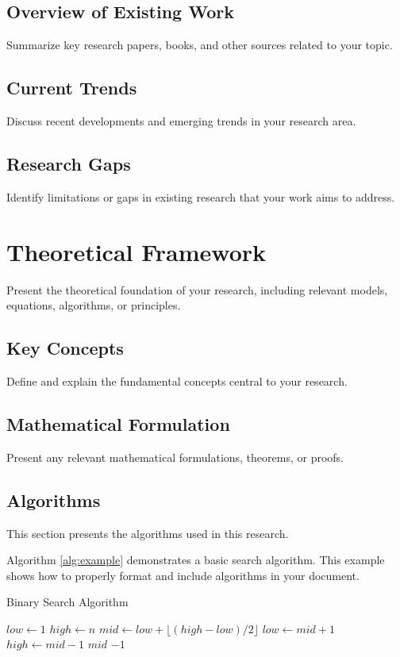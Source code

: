\section{Overview of Existing Work}
Summarize key research papers, books, and other sources related to your topic.

\section{Current Trends}
Discuss recent developments and emerging trends in your research area.

\section{Research Gaps}
Identify limitations or gaps in existing research that your work aims to address.

\chapter{Theoretical Framework}
Present the theoretical foundation of your research, including relevant models, equations, algorithms, or principles.

\section{Key Concepts}
Define and explain the fundamental concepts central to your research.

\section{Mathematical Formulation}
Present any relevant mathematical formulations, theorems, or proofs.

\section{Algorithms}
This section presents the algorithms used in this research.

Algorithm \ref{alg:example} demonstrates a basic search algorithm. This example shows how to properly format and include algorithms in your document.

\begin{algorithm}
\caption{Binary Search Algorithm}
\label{alg:example}
\begin{algorithmic}[1]
    \State $low \gets 1$
    \State $high \gets n$
        \State $mid \gets low + \lfloor (high - low) / 2 \rfloor$ 
            \State $low \gets mid + 1$
            \State $high \gets mid - 1$
        \Else
            \State \Return $mid$
        \EndIf
    \EndWhile
    \State \Return $-1$
\EndProcedure
\end{algorithmic}
\end{algorithm}

